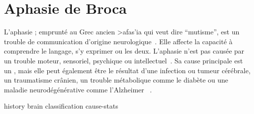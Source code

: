 \section{Aphasie de Broca}

L'aphasie ; emprunté au Grec ancien \textgreek{>afas'ia} qui veut dire ``mutisme'',
est un trouble de communication d'origine neurologique~\cite{Larousse}. 
Elle affecte la capacité à comprendre le langage, s'y exprimer ou les deux.
L'aphasie n'est pas causée par un trouble moteur, sensoriel, psychique ou intellectuel~\cite{Chapey_2008}.
Sa cause principale est un , 
mais elle peut également être le résultat d'une infection ou tumeur cérébrale, un traumatisme crânien, 
un trouble métabolique comme le diabète ou une maladie neurodégénérative comme l'Alzheimer ~\cite{Hallowell_2017}.

{history}
{brain}
{classification}
{cause-stats}